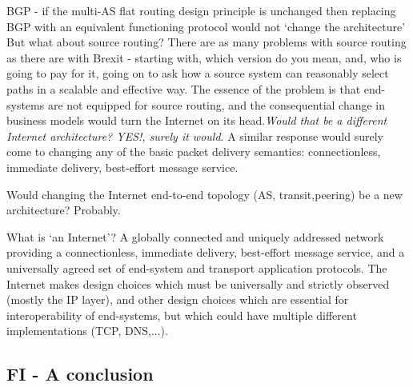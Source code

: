 BGP - if the multi-AS flat routing design principle is unchanged then replacing BGP with an equivalent functioning protocol would not ‘change the architecture’
But what about source routing?
There are as many problems with source routing as there are with Brexit - starting with, which version do you mean, and, who is going to pay for it, going on to ask how a source system can reasonably select paths in a scalable and effective way.
The essence of the problem is that end-systems are not equipped for source routing, and the consequential change in business models would turn the Internet on its head.\textit{Would that be a different Internet architecture? YES!, surely it would}.
A similar response would surely come to changing any of the basic packet delivery semantics: connectionless, immediate delivery, best-effort message service.

Would changing the Internet end-to-end topology (AS, transit,peering) be a new architecture? Probably.

What is ‘an Internet’?
A globally connected and uniquely addressed network providing a connectionless, immediate delivery, best-effort message service, and a universally agreed set of end-system and transport application protocols.
The Internet makes design choices which must be universally and strictly observed (mostly the IP layer), and other design choices which are essential for interoperability of end-systems, but which could have multiple different implementations (TCP, DNS,...).






\subsection{FI - A conclusion}


